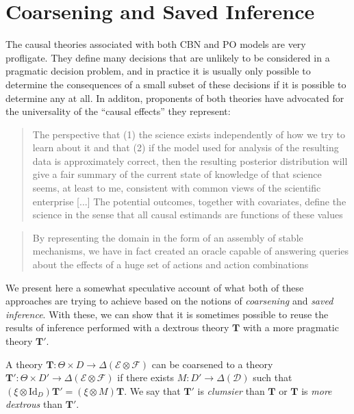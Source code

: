 
\section{Coarsening and Saved Inference}

The causal theories associated with both CBN and PO models are very profligate. They define many decisions that are unlikely to be considered in a pragmatic decision problem, and in practice it is usually only possible to determine the consequences of a small subset of these decisions if it is possible to determine any at all. In additon, proponents of both theories have advocated for the universality of the ``causal effects'' they represent:

\begin{quote}
The perspective that (1) the science exists independently of how we try to learn about it and that (2) if the model used for analysis of the resulting data is approximately correct, then the resulting posterior distribution will give a fair summary of the current state of knowledge of that science seems, at least to me, consistent with common views of the scientific enterprise
[...]
The potential outcomes, together with covariates, define the science in the sense that all causal estimands are functions of these values \citep{rubin_causal_2005}
\end{quote}

\begin{quote}
By representing the domain in the form of an assembly of stable mechanisms, we have in fact created an oracle capable of answering queries about the effects of a huge set of actions and action combinations \citep{pearl_causality:_2009}
\end{quote}

We present here a somewhat speculative account of what both of these approaches are trying to achieve based on the notions of \emph{coarsening} and \emph{saved inference}. With these, we can show that it is sometimes possible to reuse the results of inference performed with a dextrous theory $\mathbf{T}$ with a more pragmatic theory $\mathbf{T}'$.

\begin{definition}[Coarsening]
A theory $\mathbf{T}:\Theta\times D\to \Delta(\mathcal{E}\otimes\mathcal{F})$ can be coarsened to a theory $\mathbf{T}':\Theta\times D'\to \Delta(\mathcal{E}\otimes\mathcal{F})$ if there exists $M:D'\to \Delta(\mathcal{D})$ such that $(\xi \otimes \mathrm{Id}_D) \mathbf{T}'  = (\xi \otimes M) \mathbf{T}$. We say that $\mathbf{T}'$ is \emph{clumsier} than $\mathbf{T}$ or $\mathbf{T}$ is \emph{more dextrous} than $\mathbf{T}'$.
\end{definition}

